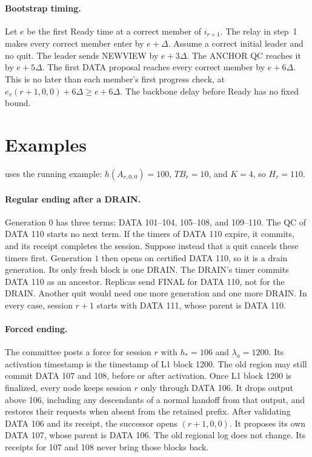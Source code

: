 \documentclass[11pt,a4paper]{article}
\newcommand{\TB}{\mathit{TB}}
\begin{document}
\paragraph{Bootstrap timing.}
Let $e$ be the first Ready time at a correct member of $i_{r+1}$. The
relay in step~1 makes every correct member enter by $e+\Delta$. Assume a
correct initial leader and no quit. The leader sends NEWVIEW by
$e+3\Delta$. The ANCHOR QC reaches it by $e+5\Delta$. The first DATA
proposal reaches every correct member by $e+6\Delta$. This is no later
than each member's first progress check, at
$e_v(r+1,0,0)+6\Delta\ge e+6\Delta$. The backbone delay before Ready has
no fixed bound.

\section{Examples}
\label{sec:examples}
 uses the running example: $h(A_{r,0,0})=100$, $\TB_r=10$,
and $K=4$, so $H_r=110$.

\paragraph{Regular ending after a DRAIN.}
Generation $0$ has three terms: DATA 101--104, 105--108, and 109--110.
The QC of DATA 110 starts no next term. If the timers of DATA 110 expire,
it commits, and its receipt completes the session. Suppose instead that
a quit cancels these timers first. Generation $1$ then opens on certified
DATA 110, so it is a drain generation. Its only fresh block is one DRAIN.
The DRAIN's timer commits DATA 110 as an ancestor. Replicas send FINAL
for DATA 110, not for the DRAIN. Another quit would need one more
generation and one more DRAIN. In every case, session $r+1$ starts with
DATA 111, whose parent is DATA 110.

\paragraph{Forced ending.}
The committee posts a force for session $r$ with $h_*=106$ and
$\lambda_a=1200$. Its activation timestamp is the timestamp of L1
block 1200. The old region may still commit DATA 107 and 108,
before or after activation. Once L1 block 1200 is finalized, every node
keeps session $r$ only through DATA 106. It drops output above 106, including any descendants of a normal
handoff from that output, and restores their requests when absent
from the retained prefix. After validating DATA 106
and its receipt, the successor opens $(r+1,0,0)$. It proposes its own
DATA 107, whose parent is DATA 106. The old regional log does not
change. Its receipts for 107 and 108 never bring those blocks back.
\end{document}
